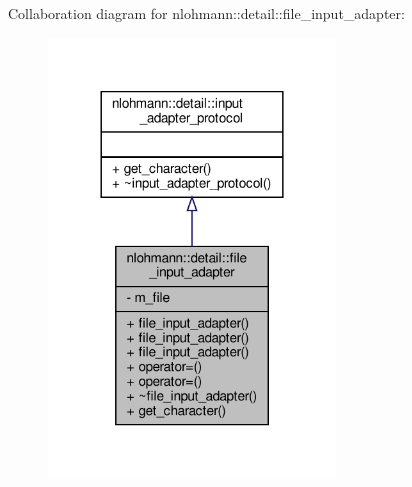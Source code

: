 Collaboration diagram for nlohmann\+:\+:detail\+:\+:file\+\_\+input\+\_\+adapter\+:\nopagebreak
\begin{figure}[H]
\begin{center}
\leavevmode
\includegraphics[width=216pt]{classnlohmann_1_1detail_1_1file__input__adapter__coll__graph}
\end{center}
\end{figure}
